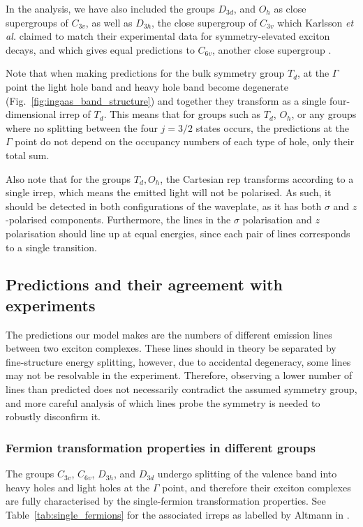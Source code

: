 In the analysis, we have also included the groups $D_{3d}$, and $O_h$ as close supergroups of $C_{3v}$, as well as $D_{3h}$, the close supergroup of $C_{3v}$ which Karlsson \textit{et al.} claimed to match their experimental data for symmetry-elevated exciton decays, and which gives equal predictions to $C_{6v}$, another close supergroup \cite[p.~19]{karlsson} .

Note that when making predictions for the bulk symmetry group $T_d$, at the $\Gamma$ point the light hole band and heavy hole band become degenerate (Fig.~\ref{fig:ingaas_band_structure}) and together they transform as a single four-dimensional irrep of $T_d$. This means that for groups such as $T_d$, $O_h$, or any groups where no splitting between the four $j=3/2$ states occurs, the predictions at the $\Gamma$ point do not depend on the occupancy numbers of each type of hole, only their total sum.

Also note that for the groups $T_d, O_h$, the Cartesian rep transforms according to a single irrep, which means the emitted light will not be polarised. As such, it should be detected in both configurations of the waveplate, as it has both $\sigma$ and $z$-polarised components. Furthermore, the lines in the $\sigma$ polarisation and $z$ polarisation should line up at equal energies, since each pair of lines corresponds to a single transition.

\subsection{Predictions and their agreement with experiments}
The predictions our model makes are the numbers of different emission lines between two exciton complexes. These lines should in theory be separated by fine-structure energy splitting, however, due to accidental degeneracy, some lines may not be resolvable in the experiment. Therefore, observing a lower number of lines than predicted does not necessarily contradict the assumed symmetry group, and more careful analysis of which lines probe the symmetry is needed to robustly disconfirm it.

\subsubsection{Fermion transformation properties in different groups}
The groups $C_{3v}$, $C_{6v}$, $D_{3h}$, and $D_{3d}$ undergo splitting of the valence band into heavy holes and light holes at the $\Gamma$ point, and therefore their exciton complexes are fully characterised by the single-fermion transformation properties. See Table~\ref{tab:single_fermions} for the associated irreps as labelled by Altmann in \cite{altmann}.

